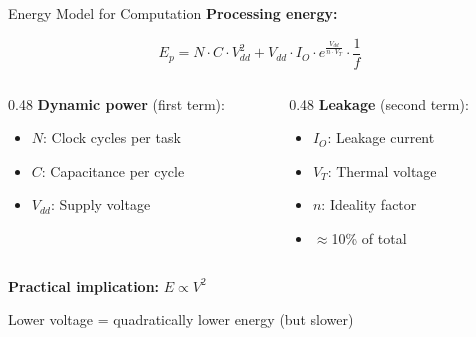 \documentclass[aspectratio=169,11pt]{beamer}
\begin{document}
\begin{frame}{Energy Model for Computation}
    \textbf{Processing energy:}
    
    \[
    E_p = N \cdot C \cdot V_{dd}^2 + V_{dd} \cdot I_O \cdot e^{\frac{V_{dd}}{n \cdot V_T}} \cdot \frac{1}{f}
    \]
    
    \vspace{0.2cm}
    \begin{columns}[T]
        \begin{column}{0.48\textwidth}
            \textbf{Dynamic power} (first term):
            \begin{itemize}
                \item $N$: Clock cycles per task
                \item $C$: Capacitance per cycle
                \item $V_{dd}$: Supply voltage
            \end{itemize}
        \end{column}
        \begin{column}{0.48\textwidth}
            \textbf{Leakage} (second term):
            \begin{itemize}
                \item $I_O$: Leakage current
                \item $V_T$: Thermal voltage
                \item $n$: Ideality factor
                \item $\approx$10\% of total
            \end{itemize}
        \end{column}
    \end{columns}
    
    \vspace{0.3cm}
    \textbf{Practical implication:} $E \propto V^2$
    
    Lower voltage = quadratically lower energy (but slower)
\end{frame}
\end{document}
